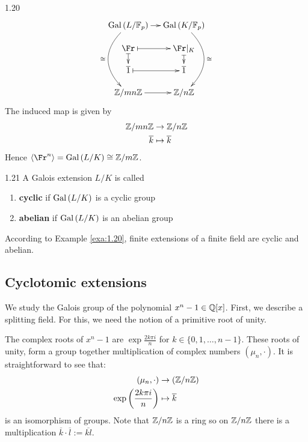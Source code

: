 \documentclass[twoside = false,	%
		headsepline,		%
		parskip = true,
		]{scrbook}						%
\begin{document}
\begin{example}{}{1.20}
    	\begin{equation*}
    	    \xymatrix@R=0.4cm @C=0.4cm
    	    {
    	        \Gal{L/\F_p}\ar[r]\ar@/_2pc/[ddd]_{\cong} & \Gal{K/\F_p}\ar@/^2pc/[ddd]^{\cong} \\
    			\Fr\ar@{|->}[r] \ar@{|->}[d] & \Fr|_K\ar@{|->}[d] \\
    			\overline{1}\ar@{|->}[r] & \overline{1} \\
    			\Z/mn\Z\ar[r] & \Z/n\Z
    	    }
    	\end{equation*}
    	The induced map is given by
    	\begin{equation*}
    	    \begin{split}
    	        \mathbb Z/mn\mathbb Z &\rightarrow \mathbb Z/n\mathbb Z \\
    	       \overline{k} &\mapsto \overline{k}
    	    \end{split}
    	\end{equation*}
    	Hence $\spitz{\Fr^n} = \Gal{L/K} \cong \Z/m\Z$.
    	\end{example}
    	
    	\begin{definition}{}{1.21}
    		A Galois extension $L/K$ is called
    		\begin{enumerate}
    			\item \textbf{cyclic} if $\mathrm{Gal}\left( L/K\right)$ is a cyclic group
    			\item \textbf{abelian} if $\mathrm{Gal}\left( L/K\right)$ is an abelian group
    		\end{enumerate}
    	\end{definition}
    
    	According to Example \ref{exa:1.20}, finite extensions of a finite field are cyclic and abelian.
        
    \subsection{Cyclotomic extensions}
        We study the Galois group of the polynomial $x^n-1 \in \mathbb Q[x]$. First, we describe a splitting field. For this, we need the notion of a primitive root of unity.
        
        The complex roots of $x^n -1 $ are $\exp{\frac{2 k \pi i}{n}}$ for $k \in \{0,1,\dots,n-1\}$. These roots of unity, form a group together multiplication of complex numbers $(\mu_n,\cdot)$. It is straightforward to see that:
        \begin{equation*}
            \begin{split}
                (\mu_n,\cdot) &\rightarrow (\mathbb Z/n\mathbb Z) \\
                    \mathrm{exp}\left(\frac{2 k \pi i}{n}\right) &\mapsto \overline{k}
            \end{split}
        \end{equation*}
        is an isomorphism of groups. Note that $\mathbb Z/n\mathbb Z$ is a ring so on $\mathbb Z/n\mathbb Z$ there is a multiplication $\overline{k} \cdot \overline{l}:= \overline{kl}$.
        
\end{document}
